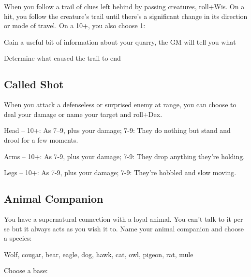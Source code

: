When you follow a trail of clues left behind by passing creatures, roll+Wis. On a hit, you follow the creature's trail until there's a significant change in its direction or mode of travel. On a 10+, you also choose 1:

           
\startitemize[1,packed]
             
\item Gain a useful bit of information about your quarry, the GM will tell you what

             
\item Determine what caused the trail to end

           
\stopitemize
           
\subsection{Called Shot}    
           

When you attack a defenseless or surprised enemy at range, you can choose to deal your damage or name your target and roll+Dex.

           
\startitemize[1,packed]
             
\item Head – 10+: As 7–9, plus your damage; 7-9: They do nothing but stand and drool for a few moments.

             
\item Arms – 10+: As 7-9, plus your damage; 7-9: They drop anything they're holding.

             
\item Legs – 10+: As 7-9, plus your damage; 7-9: They're hobbled and slow moving.

           
\stopitemize
           
\subsection{Animal Companion}    
           

You have a supernatural connection with a loyal animal. You can't talk to it per se but it always acts as you wish it to. Name your animal companion and choose a species:

           
\startExample
Wolf, cougar, bear, eagle, dog, hawk, cat, owl, pigeon, rat, mule
\stopExample
           

Choose a base:


